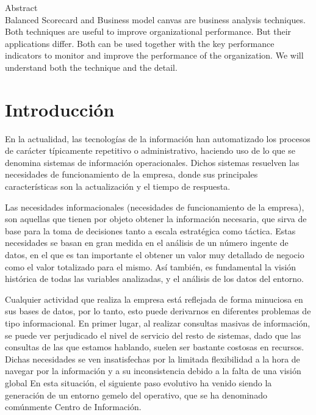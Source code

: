 


 Abstract\\
Balanced Scorecard and Business model canvas are business analysis techniques. Both techniques are useful to improve organizational performance. But their applications differ. Both can be used together with the key performance indicators to monitor and improve the performance of the organization. We will understand both the technique and the detail.
\newpage

\section{Introducción}
En la actualidad, las tecnologías de la información han automatizado los procesos de carácter típicamente repetitivo o administrativo, haciendo uso de lo que se denomina sistemas de información operacionales. Dichos sistemas resuelven las necesidades de funcionamiento de la empresa, donde sus principales características son la actualización y el tiempo de respuesta. 

Las necesidades informacionales (necesidades de funcionamiento de la empresa), son aquellas que tienen por objeto obtener la información necesaria, que sirva de base para la toma de decisiones tanto a escala estratégica como táctica. Estas necesidades se basan en gran medida en el análisis de un número ingente de datos, en el que es tan importante el obtener un valor muy detallado de negocio como el valor totalizado para el mismo. Así también, es fundamental la visión histórica de todas las variables analizadas, y el análisis de los datos del entorno. 

Cualquier actividad que realiza la empresa está reflejada de forma minuciosa en sus bases de datos, por lo tanto, esto puede derivarnos en diferentes problemas de tipo informacional. En primer lugar, al realizar consultas masivas de información, se puede ver perjudicado el nivel de servicio del resto de sistemas, dado que las consultas de las que estamos hablando, suelen ser bastante costosas en recursos. Dichas necesidades se ven insatisfechas por la limitada flexibilidad a la hora de navegar por la información y a su inconsistencia debido a la falta de una visión global En esta situación, el siguiente paso evolutivo ha venido siendo la generación de un entorno gemelo del operativo, que se ha denominado comúnmente Centro de Información. 

